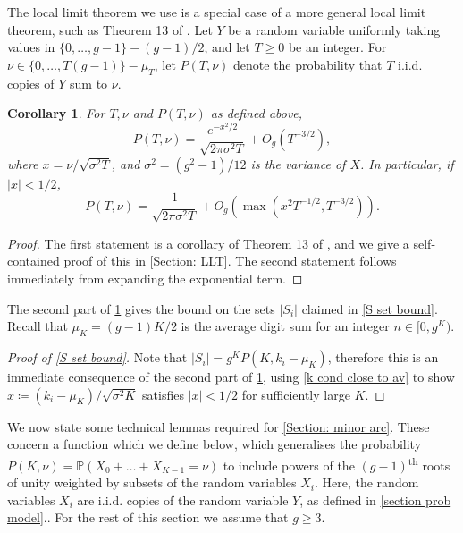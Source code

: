 \documentclass[hidelinks,11pt,reqno]{amsart}
\renewcommand{\geq}{\geqslant}
\newcommand{\prob}{\ensuremath{\mathbb{P}}}
\newcommand{\sth}{\textsuperscript{th }}
\newtheorem{cor}[prop]{Corollary}
\theoremstyle{remark}
\begin{document}
The local limit theorem we use is a special case of a more general local limit theorem, such as Theorem 13 of \cite[Ch. VII]{petrov1972independent}. Let $Y$ be a random variable uniformly taking values in $\{0,\ldots, g-1\}-(g-1)/2$, and let $T\geq 0$ be an integer. For $\nu\in \{0,\ldots, T(g-1)\}-\mu_{T}$, let $P(T,\nu)$ denote the probability that $T$ i.i.d. copies of $Y$ sum to $\nu$. 
\begin{cor}\label{Local limit theorem application version}
    For $T,\nu$ and $P(T,\nu)$ as defined above,
    \[P(T,\nu)=\frac{e^{-x^{2}/2}}{\sqrt{2\pi\sigma^{2}T}}+O_{g}(T^{-3/2}),\]
    where $x=\nu/\sqrt{\sigma^{2}T}$, and $\sigma^{2}=(g^{2}-1)/12$ is the variance of $X$. In particular, if $|x|<1/2$,
    \[P(T,\nu)=\frac{1}{\sqrt{2\pi\sigma^{2}T}}+O_{g}(\max (x^{2}T^{-1/2},T^{-3/2})).\]
\end{cor}
\begin{proof}
    The first statement is a corollary of Theorem 13 of \citep[Ch. VII]{petrov1972independent}, and we give a self-contained proof of this in \cref{Section: LLT}. The second statement follows immediately from expanding the exponential term.
\end{proof}
The second part of \cref{Local limit theorem application version} gives the bound on the sets $|S_{i}|$ claimed in \cref{S set bound}. Recall that $\mu_{K}=(g-1)K/2$ is the average digit sum for an integer $n\in [0,g^{K})$.
\begin{proof}[Proof of \cref{S set bound}]
    Note that $|S_{i}|=g^{K}P(K,k_{i}-\mu_{K})$, therefore this is an immediate consequence of the second part of \cref{Local limit theorem application version}, using \cref{k cond close to av} to show $x\coloneq (k_{i}-\mu_{K})/\sqrt{\sigma^{2}K}$ satisfies $|x|<1/2$ for sufficiently large $K$. 
\end{proof}
We now state some technical lemmas required for \cref{Section: minor arc}. These concern a function which we define below, which generalises the probability $P(K,\nu)=\prob(X_{0}+\ldots+X_{K-1}=\nu )$ to include powers of the $(g-1)$\sth roots of unity weighted by subsets of the random variables $X_{i}$. Here, the random variables $X_{i}$ are i.i.d. copies of the random variable $Y$, as defined in \cref{section prob model}.. For the rest of this section we assume that $g\geq 3$. 
\end{document}
